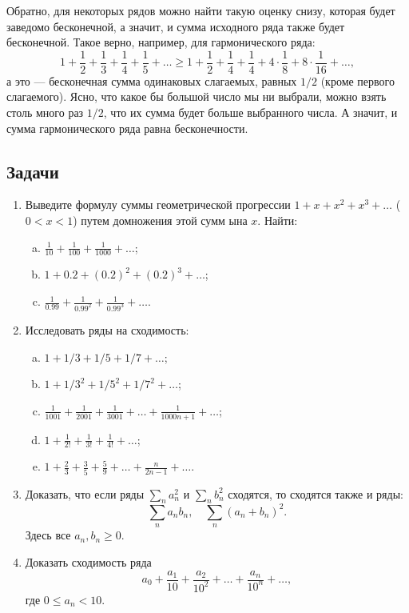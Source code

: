 Обратно, для некоторых рядов можно найти такую оценку снизу, которая будет заведомо бесконечной, а значит, и сумма исходного ряда также будет бесконечной. Такое верно, например, для гармонического ряда:
$$
1+\frac{1}{2}+\frac{1}{3}+\frac{1}{4}+\frac{1}{5}+\dots \ge 
1+\frac{1}{2}+\frac{1}{4}+\frac{1}{4}+4\cdot\frac{1}{8}+8\cdot\frac{1}{16}+\dots,
$$
а это --- бесконечная сумма одинаковых слагаемых, равных $1/2$ (кроме первого слагаемого). Ясно, что какое бы большой число мы ни выбрали, можно взять столь много раз $1/2$, что их сумма будет больше выбранного числа. А значит, и сумма гармонического ряда равна бесконечности.

\subsection*{Задачи}

\begin{enumerate}
\item Выведите формулу суммы геометрической прогрессии $1+x+x^2+x^3+\dots$ ($0<x<1$) путем домножения этой сумм ына $x$. Найти:
\begin{enumerate}[a)]
\item $\displaystyle \frac{1}{10}+\frac{1}{100}+\frac{1}{1000}+\dots$;
\item $\displaystyle 1+0.2+(0.2)^2+(0.2)^3+\dots$;
\item $\displaystyle \frac{1}{0.99}+\frac{1}{0.99^2}+\frac{1}{0.99^3}+\dots$.
\end{enumerate}
\item Исследовать ряды на сходимость:
\begin{enumerate}[a)]
\item $1+1/3+1/5+1/7+\dots$;
\item $1+1/3^2+1/5^2+1/7^2+\dots$;
\item $\displaystyle \frac{1}{1001}+\frac{1}{2001}+\frac{1}{3001}+\dots+\frac{1}{1000n+1}+\dots$;
\item $\displaystyle 1+\frac{1}{2!}+\frac{1}{3!}+\frac{1}{4!}+\dots$;
\item $\displaystyle 1+\frac{2}{3}+\frac{3}{5}+\frac{5}{9}+\dots+\frac{n}{2n-1}+\dots$.
\end{enumerate}
\item Доказать, что если ряды $\displaystyle \sum_na_n^2$ и $\displaystyle \sum_nb_n^2$ сходятся, то сходятся также и ряды:
$$
\sum_na_nb_n,\quad \sum_n(a_n+b_n)^2.
$$
Здесь все $a_n,b_n\ge 0$.
\item Доказать сходимость ряда
$$
a_0+\frac{a_1}{10}+\frac{a_2}{10^2}+\dots+\frac{a_n}{10^n}+\dots,
$$
где $0\le a_n<10$.
\end{enumerate}





